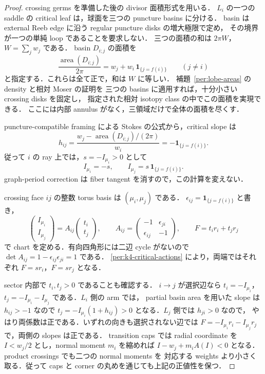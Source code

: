 \begin{proof}
crossing germs を準備した後の divisor 面積形式を用いる．
$L_i$ の一つの saddle の critical leaf は，球面を三つの puncture basins に分ける．
basin は external Reeb edge に沿う regular puncture disks の増大極限で定め，
その境界が一つの単純 loop であることを要求しない．
三つの面積の和は $2\pi W$，$W=\sum_jw_j$ である．
basin $D_{i;j}$ の面積を
\begin{equation}\label{per:k4-basin}
 \frac{\operatorname{area}(D_{i;j})}{2\pi}
 =w_j+w_i\,\mathbf1_{\{j=f(i)\}}\qquad(j\ne i)
\end{equation}
と指定する．これらは全て正で，和は $W$ に等しい．
補題~\ref{per:lobe-areas} の density と相対 Moser の証明を
三つの basins に適用すれば，十分小さい crossing disks を固定し，
指定された相対 isotopy class の中でこの面積を実現できる．
ここには内部 annulus がなく，三領域だけで全体の面積を尽くす．

puncture-compatible framing による Stokes の公式から，critical slope は
\[
 h_{ij}=\frac{w_j-\operatorname{area}(D_{i;j})/(2\pi)}{w_i}
       =-\mathbf1_{\{j=f(i)\}}.
\]
従って $i$ の ray 上では，$s=-I_{\mu_i}>0$ として
\begin{equation}\label{per:k4-critical-actions}
 I_{\mu_i}=-s,\qquad
 I_{\mu_j}=s\,\mathbf1_{\{j=f(i)\}}.
\end{equation}
graph-period correction は fiber tangent を消すので，この計算を変えない．

crossing face $ij$ の整数 torus basis は $(\mu_i,\mu_j)$ である．
$\epsilon_{ij}=\mathbf1_{\{j=f(i)\}}$ と書き，
\begin{equation}\label{per:k4-face-map}
 \begin{pmatrix}I_{\mu_i}\\ I_{\mu_j}\end{pmatrix}
 =A_{ij}\begin{pmatrix}t_i\\ t_j\end{pmatrix},\qquad
 A_{ij}=\begin{pmatrix}-1&\epsilon_{ji}\\
                         \epsilon_{ij}&-1\end{pmatrix},
 \qquad F=t_ir_i+t_jr_j
\end{equation}
で chart を定める．有向四角形には二辺 cycle がないので
$\det A_{ij}=1-\epsilon_{ij}\epsilon_{ji}=1$ である．
\eqref{per:k4-critical-actions} により，両端ではそれぞれ $F=sr_i$，$F=sr_j$ となる．

sector 内部で $t_i,t_j>0$ であることも確認する．
$i\to j$ が選択辺なら $t_i=-I_{\mu_i}$，
$t_j=-I_{\mu_i}-I_{\mu_j}$ である．$L_i$ 側の arm では，
partial basin area を用いた slope は $h_{ij}>-1$ なので
$t_j=-I_{\mu_i}(1+h_{ij})>0$ となる．$L_j$ 側では $h_{ji}>0$ なので，
やはり両係数は正である．いずれの向きも選択されない辺では
$F=-I_{\mu_i}r_i-I_{\mu_j}r_j$ で，両側の slopes は正である．
transition caps では radial coordinate を $I<w_j/2$ とし，normal moment $m_i$ を縮めれば
$I-w_j+m_i A(I)<0$ となる．product crossings でも二つの normal moments を
対応する weights より小さく取る．従って caps と corner の丸めを通じても上記の正値性を保つ．


\end{proof}
